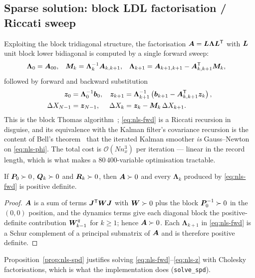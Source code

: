 \subsection{Sparse solution: block LDL factorisation / Riccati sweep}
Exploiting the block tridiagonal structure, the factorisation
$\bm{A}=\bm{L}\bm{\Lambda}\bm{L}^{\mathsf{T}}$ with $\bm{L}$ unit block lower bidiagonal is computed by a single forward
sweep:
\begin{align}
\bm{\Lambda}_0&=\bm{A}_{00}, &
\bm{M}_k&=\bm{\Lambda}_k^{-1}\bm{A}_{k,k+1}, &
\bm{\Lambda}_{k+1}&=\bm{A}_{k+1,k+1}-\bm{A}_{k,k+1}^{\mathsf{T}}\bm{M}_k ,
\label{eq:nls-fwd}
\end{align}
followed by forward and backward substitution
\begin{align}
\bm{z}_0&=\bm{\Lambda}_0^{-1}\bm{b}_0, &
\bm{z}_{k+1}&=\bm{\Lambda}_{k+1}^{-1}\left(\bm{b}_{k+1}-\bm{A}_{k,k+1}^{\mathsf{T}}\bm{z}_k\right),
\label{eq:nls-z}\\
\Delta X_{N-1}&=\bm{z}_{N-1}, &
\Delta X_k&=\bm{z}_k-\bm{M}_k\,\Delta X_{k+1} .
\label{eq:nls-back}
\end{align}
This is the block Thomas algorithm~\cite[§4.5]{golubvanloan2013}; \eqref{eq:nls-fwd} is a Riccati
recursion in disguise, and its equivalence with the Kalman filter's covariance recursion is the
content of Bell's theorem~\cite{bell1994iks} that the iterated Kalman smoother \emph{is} Gauss--Newton
on \eqref{eq:nls-phi}.  The total cost is $\mathcal{O}(N n_x^3)$ per iteration --- linear in the
record length, which is what makes a $80\,400$-variable optimisation tractable.

\begin{proposition}\label{prop:nls-spd}
If $\bm{P}_0\succ0$, $\bm{Q}_k\succ0$ and $\bm{R}_k\succ0$, then $\bm{A}\succ0$ and every
$\bm{\Lambda}_k$ produced by \eqref{eq:nls-fwd} is positive definite.
\end{proposition}
\begin{proof}
$\bm{A}$ is a sum of terms $\bm{J}^{\mathsf{T}}\bm{W}\bm{J}$ with $\bm{W}\succ0$ plus the block $\bm{P}_0^{-1}\succ0$ in the
$(0,0)$ position, and the dynamics terms give each diagonal block the positive-definite contribution
$\bm{W}^q_{k-1}$ for $k\ge1$; hence $\bm{A}\succ0$.  Each $\bm{\Lambda}_{k+1}$ in \eqref{eq:nls-fwd} is a
Schur complement of a principal submatrix of $\bm{A}$ and is therefore positive definite.
\end{proof}
Proposition~\ref{prop:nls-spd} justifies solving \eqref{eq:nls-fwd}--\eqref{eq:nls-z} with Cholesky
factorisations, which is what the implementation does (\texttt{solve\_spd}).

